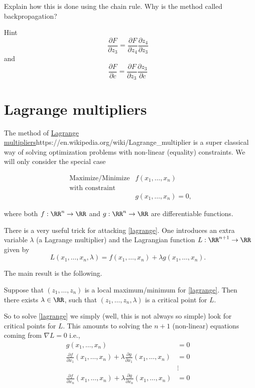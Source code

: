 \documentclass{article}
\newcommand{\pd}[2]{\frac{\partial #1}{\partial #2}}
\begin{document}
Explain how this is
done using the chain rule. Why is the method called backpropagation?

\begin{hideinbutton}{Hint}
  $$
  \pd{F}{z_3} = \pd{F}{z_4} \pd{z_4}{z_3}
  $$
  and
  $$
  \pd{F}{c} = \pd{F}{z_3} \pd{z_3}{c}
  $$
\end{hideinbutton}

\endshex





\section{Lagrange multipliers}\label{Lagrangemult}


The method of \url{Lagrange multipliers}{https://en.wikipedia.org/wiki/Lagrange_multiplier} is a super classical way of solving
optimization problems with non-linear (equality) constraints. We will only
consider the special case

  \begin{align}\label{lagrange}
    &\text{Maximize/Minimize} &f(x_1, \dots, x_n)\\
    &\text{with constraint}\\
    &&g (x_1, \dots, x_n) = 0,
  \end{align}

  where both $f:\RR^n\rightarrow \RR$ and $g:\RR^n\rightarrow \RR$ are
  differentiable functions.

  There is a very useful trick for attacking \eqref{lagrange}. One introduces an
  extra variable $\lambda$ (a Lagrange multiplier) and the Lagrangian function
  $L:\RR^{n+1}\rightarrow \RR$ given by
  $$
  L(x_1, \dots, x_n, \lambda) = f(x_1, \dots, x_n) + \lambda g(x_1, \dots, x_n).
  $$

  The main result is the following.

  \begin{theorem}[emph]\label{lagrmultthm}
    Suppose that $(z_1, \dots, z_n)$ is a local maximum/minimum for \eqref{lagrange}. Then there exists
    $\lambda\in \RR$, such that $(z_1, \dots, z_n, \lambda)$ is a critical point for $L$.
  \end{theorem}


  So to solve \eqref{lagrange} we simply (well, this is not always so simple) look for critical points for
  $L$. This amounts to solving the $n+1$ (non-linear) equations coming from $\nabla L = 0$ i.e.,
  \begin{align}
    g(x_1, \dots, x_n) &= 0\\
    \pd{f}{x_1}(x_1, \dots, x_n) + \lambda \pd{g}{x_1}(x_1, \dots, x_n) &= 0\\
                       &\vdots\\
    \pd{f}{x_n}(x_1, \dots, x_n) + \lambda \pd{g}{x_n}(x_1, \dots, x_n) &= 0         
  \end{align}
\end{document}
